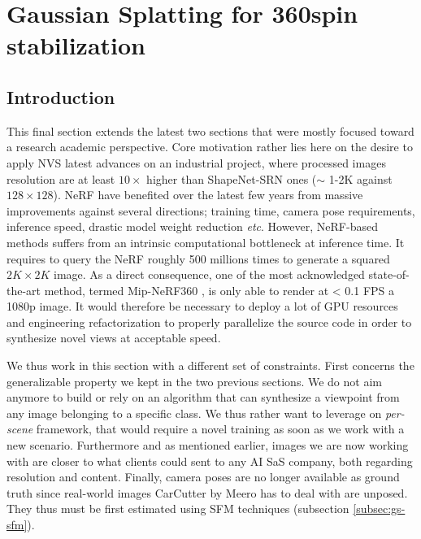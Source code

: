 \chapter{Gaussian Splatting for 360\degree spin stabilization}
\label{chapter:gausssplat}

 


\section{Introduction}
This final section extends the latest two sections that were mostly focused toward a research academic perspective. Core motivation rather lies here on the desire to apply \ac{NVS} latest advances on an industrial project, where processed images resolution are at least $10\times$ higher than ShapeNet-SRN \citep{chang2015shapenet,sitzmann2019scene} ones ($\sim$ 1-2K against $128\times128$). \ac{NeRF} have benefited over the latest few years from massive improvements against several directions; training time, camera pose requirements, inference speed, drastic model weight reduction \textit{etc}. 
However, \ac{NeRF}-based methods suffers from an intrinsic computational bottleneck at inference time. It requires to query the \ac{NeRF} roughly 500 millions times to generate a squared $2K\times2K$ image. As a direct consequence, one of the most acknowledged state-of-the-art method, termed Mip-NeRF360 \citep{barron2022mip}, is only able to render at < 0.1 \ac{FPS} a 1080p image. It would therefore be necessary to deploy a lot of \ac{GPU} resources and engineering refactorization to properly parallelize the source code in order to synthesize novel views at acceptable speed. 

We thus work in this section with a different set of constraints. First concerns the generalizable property we kept in the two previous sections. We do not aim anymore to build or rely on an algorithm that can synthesize a viewpoint from any image belonging to a specific class. We thus rather want to leverage on \textit{per-scene} framework, that would require a novel training as soon as we work with a new scenario. Furthermore and as mentioned earlier, images we are now working with are closer to what clients could sent to any \ac{AI} SaS company, both regarding resolution and content. Finally, camera poses are no longer available as ground truth since real-world images CarCutter by Meero has to deal with are unposed. They thus must be first estimated using \ac{SFM} techniques (subsection \ref{subsec:gs-sfm}).

